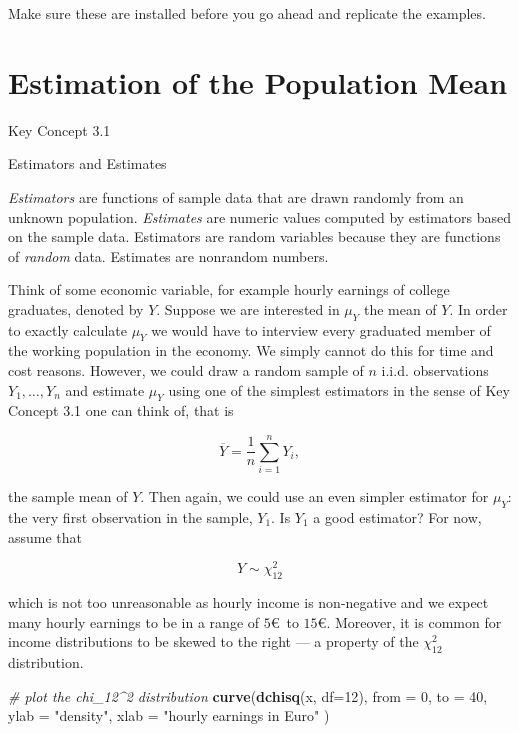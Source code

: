 \documentclass[]{book}
\newenvironment{Shaded}{\begin{snugshade}}{\end{snugshade}}
\newcommand{\KeywordTok}[1]{\textcolor[rgb]{0.13,0.29,0.53}{\textbf{#1}}}
\newcommand{\DataTypeTok}[1]{\textcolor[rgb]{0.13,0.29,0.53}{#1}}
\newcommand{\DecValTok}[1]{\textcolor[rgb]{0.00,0.00,0.81}{#1}}
\newcommand{\StringTok}[1]{\textcolor[rgb]{0.31,0.60,0.02}{#1}}
\newcommand{\CommentTok}[1]{\textcolor[rgb]{0.56,0.35,0.01}{\textit{#1}}}
\newcommand{\NormalTok}[1]{#1}
\theoremstyle{definition}
\theoremstyle{definition}
\theoremstyle{definition}
\theoremstyle{remark}
\begin{document}
Make sure these are installed before you go ahead and replicate the
examples.

\section{Estimation of the Population
Mean}\label{estimation-of-the-population-mean}

Key Concept 3.1

Estimators and Estimates

\emph{Estimators} are functions of sample data that are drawn randomly
from an unknown population. \emph{Estimates} are numeric values computed
by estimators based on the sample data. Estimators are random variables
because they are functions of \emph{random} data. Estimates are
nonrandom numbers.

Think of some economic variable, for example hourly earnings of college
graduates, denoted by \(Y\). Suppose we are interested in \(\mu_Y\) the
mean of \(Y\). In order to exactly calculate \(\mu_Y\) we would have to
interview every graduated member of the working population in the
economy. We simply cannot do this for time and cost reasons. However, we
could draw a random sample of \(n\) i.i.d. observations
\(Y_1, \dots, Y_n\) and estimate \(\mu_Y\) using one of the simplest
estimators in the sense of Key Concept 3.1 one can think of, that is

\[ \overline{Y} = \frac{1}{n} \sum_{i=1}^n Y_i, \]

the sample mean of \(Y\). Then again, we could use an even simpler
estimator for \(\mu_Y\): the very first observation in the sample,
\(Y_1\). Is \(Y_1\) a good estimator? For now, assume that

\[ Y \sim \chi_{12}^2 \]

which is not too unreasonable as hourly income is non-negative and we
expect many hourly earnings to be in a range of \(5€\,\) to \(15€\).
Moreover, it is common for income distributions to be skewed to the
right --- a property of the \(\chi^2_{12}\) distribution.

\begin{Shaded}
\begin{Highlighting}[]
\CommentTok{# plot the chi_12^2 distribution}
\KeywordTok{curve}\NormalTok{(}\KeywordTok{dchisq}\NormalTok{(x, }\DataTypeTok{df=}\DecValTok{12}\NormalTok{), }
      \DataTypeTok{from =} \DecValTok{0}\NormalTok{, }
      \DataTypeTok{to =} \DecValTok{40}\NormalTok{, }
      \DataTypeTok{ylab =} \StringTok{"density"}\NormalTok{, }
      \DataTypeTok{xlab =} \StringTok{"hourly earnings in Euro"}
\NormalTok{      )}
\end{Highlighting}
\end{Shaded}
\end{document}
